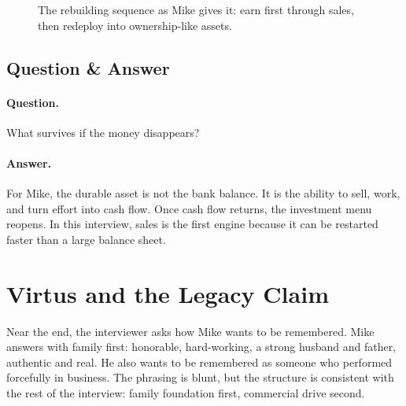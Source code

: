 \begin{figure}
\centering
{}
\caption{The rebuilding sequence as Mike gives it: earn first through sales, then redeploy into ownership-like assets.}
\end{figure}

\subsection{Question \& Answer}

\paragraph{Question.}
What survives if the money disappears?

\paragraph{Answer.}
For Mike, the durable asset is not the bank balance. It is the ability to sell, work, and turn effort into cash flow. Once cash flow returns, the investment menu reopens. In this interview, sales is the first engine because it can be restarted faster than a large balance sheet.

\section{Virtus and the Legacy Claim}

Near the end, the interviewer asks how Mike wants to be remembered. Mike answers with family first: honorable, hard-working, a strong husband and father, authentic and real. He also wants to be remembered as someone who performed forcefully in business. The phrasing is blunt, but the structure is consistent with the rest of the interview: family foundation first, commercial drive second.

